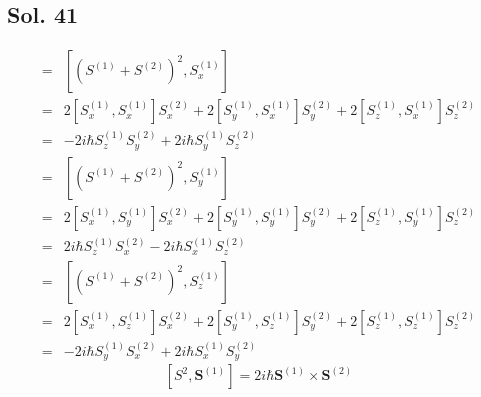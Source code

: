        \subsection*{Sol. 41}
       \begin{align*}
           [S^2, S_x^{(1)}] = & 
           [(S^{(1)} + S^{(2)})^2, S_x^{(1)}]\\
           =&
           2[S^{(1)}_x, S^{(1)}_x]S^{(2)}_x
           +
           2[S^{(1)}_y, S^{(1)}_x]S^{(2)}_y
           +
           2[S^{(1)}_z, S^{(1)}_x]S^{(2)}_z\\
           =&
           -2i\hbar S^{(1)}_zS^{(2)}_y
            + 2i\hbar S^{(1)}_yS_z^{(2)}
       \end{align*}
       \begin{align*}
           [S^2, S_y^{(1)}] = & 
           [(S^{(1)} + S^{(2)})^2, S_y^{(1)}]\\
           =&
           2[S^{(1)}_x, S^{(1)}_y]S^{(2)}_x
           +
           2[S^{(1)}_y, S^{(1)}_y]S^{(2)}_y
           +
           2[S^{(1)}_z, S^{(1)}_y]S^{(2)}_z\\
           =&
           2i\hbar S^{(1)}_zS^{(2)}_x
            - 2i\hbar S^{(1)}_xS_z^{(2)}
       \end{align*}
       \begin{align*}
           [S^2, S_z^{(1)}] = & 
           [(S^{(1)} + S^{(2)})^2, S_z^{(1)}]\\
           =&
           2[S^{(1)}_x, S^{(1)}_z]S^{(2)}_x
           +
           2[S^{(1)}_y, S^{(1)}_z]S^{(2)}_y
           +
           2[S^{(1)}_z, S^{(1)}_z]S^{(2)}_z\\
           =&
           -2i\hbar S^{(1)}_yS^{(2)}_x
            + 2i\hbar S^{(1)}_xS_y^{(2)}
       \end{align*}
       $$
       [S^2, \bm{S}^{(1)}
       ] = 2i\hbar\bm{S}^{(1)}\times \bm{S}^{(2)}
       $$
